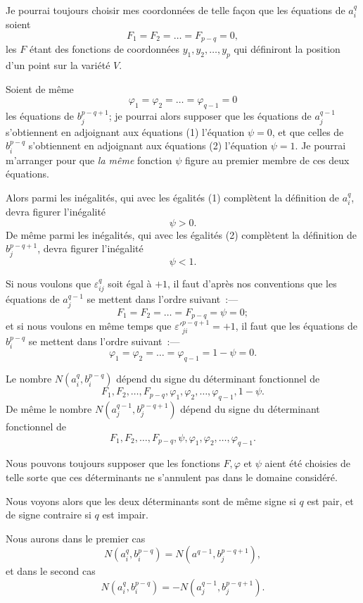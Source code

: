 \documentclass{article}
\begin{document}
Je pourrai toujours choisir mes coordonnées de telle façon que les équations de $a^{q}_{i}$ soient
\[ F_{1} = F_{2} = \ldots = F_{p-q} = 0, \tag{3} \]
les $F$ étant des fonctions de coordonnées $y_{1}, y_{2}, \ldots, y_{p}$ qui définiront la position d'un point sur la variété $V$.

Soient de même
\[ \varphi_{1} = \varphi_{2} = \ldots = \varphi_{q-1} = 0 \tag{4} \]
les équations de $b^{p-q+1}_{j}$; je pourrai alors supposer que les équations de $a^{q-1}_{j}$ s'obtiennent en adjoignant aux équations (1) l'équation $\psi = 0$, et que celles de $b^{p-q}_{i}$ s'obtiennent en adjoignant aux équations (2) l'équation $\psi = 1$. Je pourrai m'arranger pour que \emph{la même} fonction $\psi$ figure au premier membre de ces deux équations.

Alors parmi les inégalités, qui avec les égalités (1) complètent la définition de $a^{q}_{i}$, devra figurer l'inégalité
\[ \psi > 0. \]
De même parmi les inégalités, qui avec les égalités (2) complètent la définition de $b^{p-q+1}_{j}$, devra figurer l'inégalité
\[ \psi < 1. \]

Si nous voulons que $\varepsilon^{q}_{ij}$ soit égal à $+1$, il faut d'après nos conventions que les équations de $a^{q-1}_{j}$ se mettent dans l'ordre suivant~:---
\[ F_{1} = F_{2} = \ldots = F_{p-q} = \psi = 0; \]
et si nous voulons en même temps que $\varepsilon'^{p-q+1}_{ji} = +1$, il faut que les équations de $b^{p-q}_{i}$ se mettent dans l'ordre suivant~:---
\[ \varphi_{1} = \varphi_{2} = \ldots = \varphi_{q-1} = 1 - \psi = 0. \]

Le nombre $N(a^{q}_{i}, b^{p-q}_{i})$ dépend du signe du déterminant fonctionnel de
\[ F_{1}, F_{2}, \ldots, F_{p-q}, \varphi_{1}, \varphi_{2}, \ldots, \varphi_{q-1}, 1 - \psi. \]
De même le nombre $N(a^{q-1}_{j}, b^{p-q+1}_{j})$ dépend du signe du déterminant fonctionnel de
\[ F_{1}, F_{2}, \ldots, F_{p-q}, \psi, \varphi_{1}, \varphi_{2}, \ldots, \varphi_{q-1}. \]

Nous pouvons toujours supposer que les fonctions $F, \varphi$ et $\psi$ aient été choisies de telle sorte que ces déterminants ne s'annulent pas dans le domaine considéré.

Nous voyons alors que les deux déterminants sont de même signe si $q$ est pair, et de signe contraire si $q$ est impair.

Nous aurons dans le premier cas
\[ N(a^{q}_{i}, b^{p-q}_{i}) = N(a^{q-1}, b^{p-q+1}_{j}), \]
et dans le second cas
\[ N(a^{q}_{i}, b^{p-q}_{i}) = -N(a^{q-1}_{j}, b^{p-q+1}_{j}). \]
\end{document}
